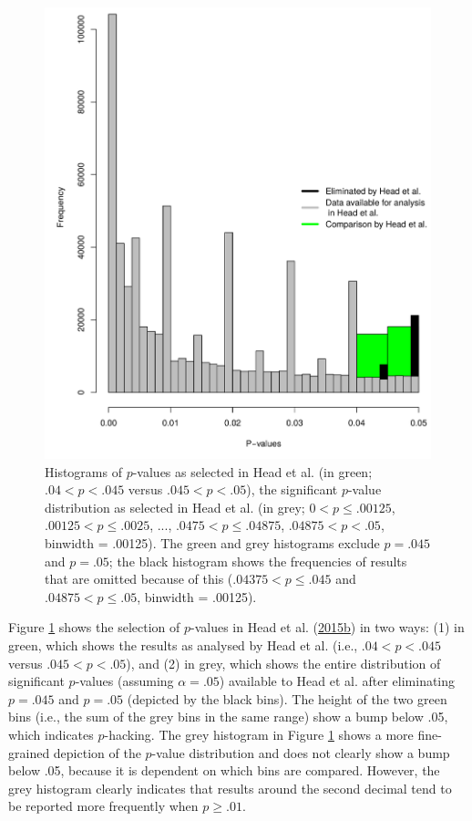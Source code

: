 \documentclass[a5paper]{book}
\begin{document}
\begin{figure}

{\centering \includegraphics[width=0.8\linewidth]{assets/figures/head-fig1} 

}

\caption{Histograms of $p$-values as selected in Head et al. (in green; $.04 < p < .045$ versus $.045 < p < .05$), the significant $p$-value distribution as selected in Head et al. (in grey; $0<p\leq.00125$, $.00125<p\leq.0025$, ..., $.0475<p\leq.04875$, $.04875<p<.05$, binwidth = .00125). The green and grey histograms exclude $p=.045$ and $p=.05$; the black histogram shows the frequencies of results that are omitted because of this ($.04375<p\leq.045$ and $.04875<p\leq.05$, binwidth = .00125).}\label{fig:head-hist}
\end{figure}

Figure \ref{fig:head-hist} shows the selection of \(p\)-values in Head
et al.
(\protect\hyperlink{ref-doi:10.1371ux2fjournal.pbio.1002106}{2015}\protect\hyperlink{ref-doi:10.1371ux2fjournal.pbio.1002106}{b})
in two ways: (1) in green, which shows the results as analysed by Head
et al. (i.e., \(.04<p<.045\) versus \(.045<p<.05\)), and (2) in grey,
which shows the entire distribution of significant \(p\)-values
(assuming \(\alpha=.05\)) available to Head et al. after eliminating
\(p=.045\) and \(p=.05\) (depicted by the black bins). The height of the
two green bins (i.e., the sum of the grey bins in the same range) show a
bump below .05, which indicates \(p\)-hacking. The grey histogram in
Figure \ref{fig:head-hist} shows a more fine-grained depiction of the
\(p\)-value distribution and does not clearly show a bump below .05,
because it is dependent on which bins are compared. However, the grey
histogram clearly indicates that results around the second decimal tend
to be reported more frequently when \(p\geq.01\).
\end{document}
